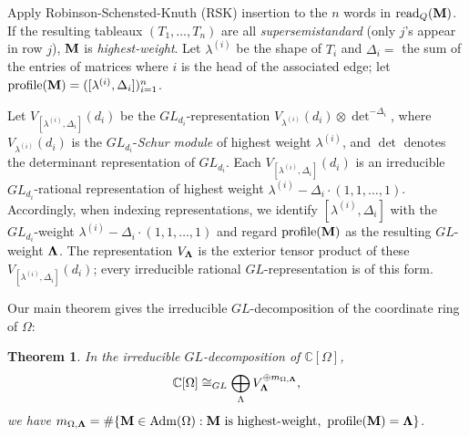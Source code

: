 \documentclass[12pt]{amsart}
\DeclareMathOperator{\Std}{\operatorname{Adm}}
\newtheorem{theorem}{Theorem}[section]
\theoremstyle{definition}
\theoremstyle{remark}
\begin{document}
Apply Robinson-Schensted-Knuth (RSK) insertion to the $n$ words in 
$\operatorname{read}_Q({\bf M})$. If the resulting tableaux $(T_1,\ldots,T_n)$ are all 
\emph{supersemistandard} (only $j$'s appear in row $j$), ${\bf M}$ is \emph{highest-weight}.
Let $\lambda^{(i)}$ be the shape of $T_i$ and $\Delta_i=$ the sum of the entries of matrices where $i$ is the head of the associated edge; let $\operatorname{profile}({\bf M})=([\lambda^{(i)},\Delta_i])_{i=1}^n$.

Let $V_{[\lambda^{(i)},\Delta_i]}(d_i)$ be the $GL_{d_i}$-representation 
$V_{\lambda^{(i)}}(d_i)\otimes
\det^{-\Delta_i}$, where $V_{\lambda^{(i)}}(d_i)$ is the $GL_{d_i}$-\emph{Schur module} 
of highest weight $\lambda^{(i)}$, and 
 $\det$ denotes the determinant representation of $GL_{d_i}$. Each $V_{[\lambda^{(i)},\Delta_i]}(d_i)$ is an irreducible
$GL_{d_i}$-rational representation of highest weight $\lambda^{(i)}-\Delta_i\cdot(1,1,\ldots,1)$.
Accordingly, when indexing representations, we identify $[\lambda^{(i)},\Delta_i]$ with the $GL_{d_i}$-weight
$\lambda^{(i)}-\Delta_i\cdot(1,1,\ldots,1)$ and regard $\operatorname{profile}({\bf M})$ as the resulting $GL$-weight $\bf\Lambda$. 
The representation $V_{\bf\Lambda}$ is the exterior tensor product of these $V_{[\lambda^{(i)},\Delta_i]}(d_i)$; every irreducible rational $GL$-representation is of this form.

Our main theorem gives the irreducible $GL$-decomposition of the coordinate ring of $\Omega$:

\begin{theorem}\label{thm:newrule}
In the irreducible $GL$-decomposition of $\mathbb{C}[\Omega]$,
\[
{\mathbb C}[\Omega]\cong_{GL} \bigoplus_{\Lambda} V_{{\bf \Lambda}}^{\oplus m_{\Omega, \bf \Lambda}},
\]
we have $m_{\Omega,{\bf \Lambda}}=\#\{{\bf M}\in\Std(\Omega): {\bf M}\text{ is highest-weight},\ 
\operatorname{profile}({\bf M})={\bf \Lambda}\}$.
\end{theorem}
\end{document}
